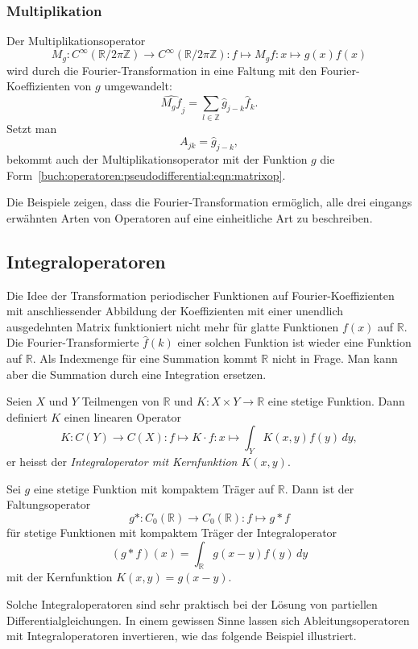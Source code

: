 \subsubsection{Multiplikation}
Der Multiplikationsoperator
\[
M_g\colon
C^{\infty}(\mathbb{R}/2\pi\mathbb{Z})
\to
C^{\infty}(\mathbb{R}/2\pi\mathbb{Z})
:
f\mapsto M_gf : x \mapsto g(x)f(x)
\]
wird durch die Fourier-Transformation in eine Faltung mit den
Fourier-Koeffizienten von $g$ umgewandelt:
\[
\widehat{M_gf}_j
=
\sum_{l\in\mathbb{Z}}
\hat{g}_{j-k}
\hat{f}_k.
\]
Setzt man
\[
A_{jk}
=
\hat{g}_{j-k},
\]
bekommt auch der Multiplikationsoperator mit der Funktion $g$ die 
Form~\eqref{buch:operatoren:pseudodifferential:eqn:matrixop}.

Die Beispiele zeigen, dass die Fourier-Transformation ermöglich,
alle drei eingangs erwähnten Arten von Operatoren auf eine einheitliche
Art zu beschreiben.

%
%
\subsection{Integraloperatoren}
Die Idee der Transformation periodischer Funktionen auf
Fourier-Koeffizienten mit anschliessender Abbildung der
Koeffizienten mit einer unendlich ausgedehnten Matrix funktioniert
nicht mehr für glatte Funktionen $f(x)$ auf $\mathbb{R}$.
Die Fourier-Transformierte $\hat{f}(k)$ einer solchen Funktion ist wieder
eine Funktion auf $\mathbb{R}$.
Als Indexmenge für eine Summation kommt $\mathbb{R}$ nicht in Frage.
Man kann aber die Summation durch eine Integration ersetzen.

\begin{definition}
Seien $X$ und $Y$ Teilmengen von $\mathbb{R}$
und $K\colon X\times Y\to\mathbb{R}$ eine stetige Funktion.
Dann definiert $K$ einen linearen Operator
\[
K
\colon
C(Y) \to C(X)
:
f \mapsto K\cdot f: x\mapsto \int_Y K(x,y) f(y)\,dy,
\]
er heisst der {\em Integraloperator mit Kernfunktion $K(x,y)$}.
\end{definition}

\begin{beispiel}
Sei $g$ eine stetige Funktion mit kompaktem Träger auf $\mathbb{R}$.
Dann ist der Faltungsoperator
\[
g*
\colon 
C_0(\mathbb{R})
\to
C_0(\mathbb{R})
:
f
\mapsto g*f
\]
für stetige Funktionen mit kompaktem Träger der Integraloperator
\[
(g*f)(x)
=
\int_{\mathbb R} g(x-y) f(y)\,dy
\]
mit der Kernfunktion $K(x,y) = g(x-y)$.
\end{beispiel}

Solche Integraloperatoren sind sehr praktisch bei der Lösung von
partiellen Differentialgleichungen.
In einem gewissen Sinne lassen sich Ableitungsoperatoren mit
Integraloperatoren invertieren, wie das folgende Beispiel illustriert.

